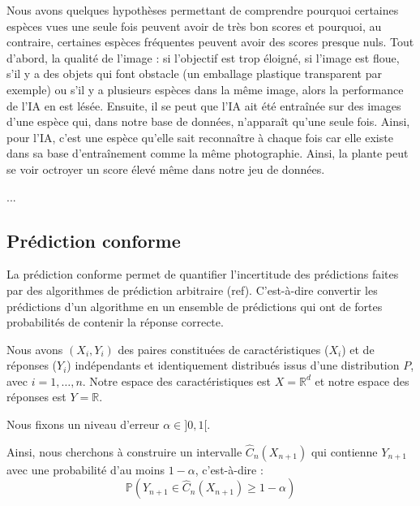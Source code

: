 \documentclass[a4paper,12pt]{article}
\begin{document}
\vspace{2.0cm}

Nous avons quelques hypothèses permettant de comprendre pourquoi certaines espèces vues une seule fois peuvent avoir de très bon scores et pourquoi, au contraire, certaines espèces fréquentes peuvent avoir des scores presque nuls. Tout d'abord, la qualité de l'image : si l'objectif est trop éloigné, si l'image est floue, s'il y a des objets qui font obstacle (un emballage plastique transparent par exemple) ou s'il y a plusieurs espèces dans la même image, alors la performance de l'IA en est lésée.
Ensuite, il se peut que l'IA ait été entraînée sur des images d'une espèce qui, dans notre base de données, n'apparaît qu'une seule fois. Ainsi, pour l'IA, c'est une espèce qu'elle sait reconnaître à chaque fois car elle existe dans sa base d'entraînement comme la même photographie. Ainsi, la plante peut se voir octroyer un score élevé même dans notre jeu de données.

...


\subsection{Prédiction conforme}

La prédiction conforme permet de quantifier l'incertitude des prédictions faites par des algorithmes de prédiction arbitraire (ref). C'est-à-dire convertir les prédictions d'un algorithme en un ensemble de prédictions qui ont de fortes probabilités de contenir la réponse correcte.

\vspace{0.2cm}

Nous avons $(X_i, Y_i)$ des paires constituées de caractéristiques ($X_i$) et de réponses ($Y_i$) indépendants et identiquement distribués issus d'une distribution $P$, avec $i = 1, \dots, n$. Notre espace des caractéristiques est $X = \mathbb R^d$ et notre espace des réponses est $Y = \mathbb R$.

\vspace{0.2cm}

Nous fixons un niveau d'erreur $\alpha \in ]0,1[$.

\vspace{0.2cm}

Ainsi, nous cherchons à construire un intervalle $\hat C_n (X_{n+1})$ qui contienne $Y_{n+1}$ avec une probabilité d'au moins $1- \alpha$, c'est-à-dire : $$ \mathbb P(Y_{n+1} \in \hat C_n (X_{n+1}) \geq 1 - \alpha) $$
\end{document}
